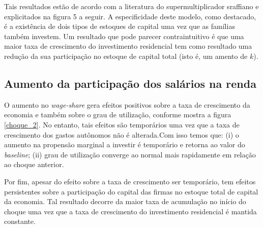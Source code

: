 Tais resultados estão de acordo com a literatura do supermultiplicador sraffiano e explicitados na figura 5 a seguir. A especificidade deste modelo, como destacado, é a existência de dois tipos de estoques de capital uma vez que as famílias também investem. Um resultado que pode parecer contraintuitivo é que uma maior taxa de crescimento do investimento residencial tem como resultado uma redução  da sua participação no estoque de capital total (isto é, um amento de $k$).


\subsection{Aumento da participação dos salários na renda}

O aumento no \textit{wage-share} gera efeitos positivos sobre a taxa de crescimento da economia e também sobre o grau de utilização, conforme mostra a figura \ref{choque_2}. No entanto, tais efeitos são temporários uma vez que a taxa de crescimento dos gastos autônomos não é alterada.Com isso temos que: (i) o aumento na propensão marginal a investir é temporário e retorna ao valor do \textit{baseline}; (ii) grau de utilização converge ao normal mais rapidamente em relação ao choque anterior. 

Por fim, apesar do efeito sobre a taxa de crescimento ser temporário, tem efeitos persistentes sobre a participação do capital das firmas no estoque total de capital da economia. Tal resultado decorre da maior taxa de acumulação no início do choque uma vez que a taxa de crescimento do investimento residencial é mantida constante. 

